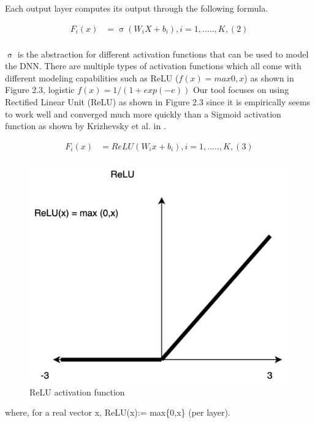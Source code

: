 Each output layer computes its output through the following formula. 

\begin{align*}
F_i(x) &= \upsigma(W_iX + b_i) ,  i = 1,.....,K, (2)  \\
\end{align*}

$\upsigma$ is the abstraction for different activation functions that can be used to model the DNN. There are multiple types of activation functions which all come with different modeling capabilities such as ReLU ($f(x) = max {0,x}$) as shown in Figure 2.3, logistic $f(x)=1/(1+ exp(-e))$
 Our tool focuses on using Rectified Linear Unit (ReLU) as shown in Figure 2.3 since it is empirically seems to work well and converged much more quickly than a Sigmoid  activation function as shown by Krizhevsky et al. in \cite{10.1145/3065386}.  %

\begin{align*}
F_i(x) &= ReLU(W_ix + b_i) ,  i = 1,.....,K , (3) \\
\end{align*}


\begin{figure}
	\centering
	\includegraphics[width=0.7\linewidth]{Images/ReLU}
	\caption[Activation functions]{ReLU activation function}
	\label{fig:ReLU}
\end{figure}
where, for a real vector x, ReLU(x):= max\{0,x\} (per layer).


